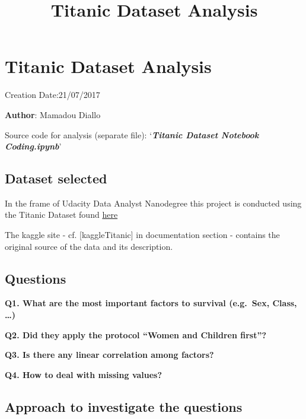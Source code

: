 \documentclass[11pt]{article}
\title{Titanic Dataset Analysis}
\begin{document}
    
    
    \maketitle
    
    

    
    \section{Titanic Dataset Analysis}\label{titanic-dataset-analysis}

Creation Date:21/07/2017

\textbf{Author}: Mamadou Diallo

Source code for analysis (separate file): `\textbf{\emph{Titanic Dataset
Notebook Coding.ipynb}}'

    \subsection{Dataset selected}\label{dataset-selected}

In the frame of Udacity Data Analyst Nanodegree this project is
conducted using the Titanic Dataset found
\href{https://d17h27t6h515a5.cloudfront.net/topher/2016/September/57e9a84c_titanic-data/titanic-data.csv}{here}

The kaggle site - cf. {[}kaggleTitanic{]} in documentation section -
contains the original source of the data and its description.

    \subsection{Questions}\label{questions}

\textbf{Q1. What are the most important factors to survival (e.g.~Sex,
Class, \ldots{})}

\textbf{Q2. Did they apply the protocol ``Women and Children first''?}

\textbf{Q3. Is there any linear correlation among factors?}

\textbf{Q4. How to deal with missing values?}

    \subsection{Approach to investigate the
questions}\label{approach-to-investigate-the-questions}
\end{document}
